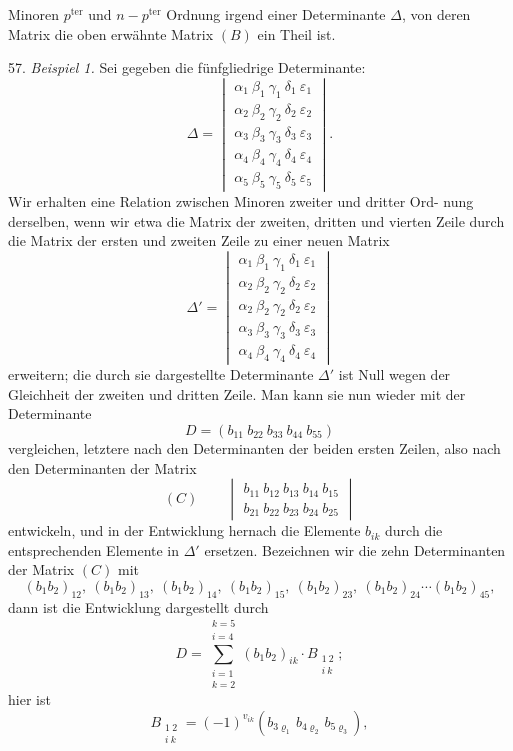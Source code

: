 Minoren $p^{\text{ter}}$ und $n-p^{\text{ter}}$ Ordnung irgend einer Determinante $\Delta$, von
deren Matrix die oben erwähnte Matrix $(B)$ ein Theil ist.

57. \textit{Beispiel 1.} Sei gegeben die fünfgliedrige Determinante:
\[
\Delta = \begin{vmatrix}
\alpha_1\ \beta_1\ \gamma_1\ \delta_1\ \varepsilon_1 \\
\alpha_2\ \beta_2\ \gamma_2\ \delta_2\ \varepsilon_2 \\
\alpha_3\ \beta_3\ \gamma_3\ \delta_3\ \varepsilon_3 \\
\alpha_4\ \beta_4\ \gamma_4\ \delta_4\ \varepsilon_4 \\
\alpha_5\ \beta_5\ \gamma_5\ \delta_5\ \varepsilon_5
\end{vmatrix} .
\]
Wir erhalten eine Relation zwischen Minoren zweiter und dritter Ord-
nung derselben, wenn wir etwa die Matrix der zweiten, dritten und
vierten Zeile durch die Matrix der ersten und zweiten Zeile zu einer
neuen Matrix
\[
\Delta' = \begin{vmatrix}
\alpha_1\ \beta_1\ \gamma_1\ \delta_1\ \varepsilon_1 \\
\alpha_2\ \beta_2\ \gamma_2\ \delta_2\ \varepsilon_2 \\
\alpha_2\ \beta_2\ \gamma_2\ \delta_2\ \varepsilon_2 \\
\alpha_3\ \beta_3\ \gamma_3\ \delta_3\ \varepsilon_3 \\
\alpha_4\ \beta_4\ \gamma_4\ \delta_4\ \varepsilon_4
\end{vmatrix}
\]
erweitern; die durch sie dargestellte Determinante $\Delta'$ ist Null wegen
der Gleichheit der zweiten und dritten Zeile. Man kann sie nun wieder
mit der Determinante
\[
D = \left(b_{11}\ b_{22}\ b_{33}\ b_{44}\ b_{55}\right)
\]
vergleichen, letztere nach den Determinanten der beiden ersten Zeilen,
also nach den Determinanten der Matrix
\[
(C) \qquad \begin{vmatrix} b_{11}\ b_{12}\ b_{13}\ b_{14}\ b_{15} \\ b_{21}\ b_{22}\ b_{23}\ b_{24}\ b_{25} \end{vmatrix}
\]
entwickeln, und in der Entwicklung hernach die Elemente $b_{ik}$ durch
die entsprechenden Elemente in $\Delta'$ ersetzen. Bezeichnen wir die zehn
Determinanten der Matrix $(C)$ mit
\[
(b_1b_2)_{12},\ (b_1b_2)_{13},\ (b_1b_2)_{14},\ (b_1b_2)_{15},\ (b_1b_2)_{23},\ (b_1b_2)_{24}\cdots (b_1b_2)_{45},
\]
dann ist die Entwicklung dargestellt durch
\[
D = \sum_{\substack{i=1\\ k=2}}^{\substack{k=5\\ i=4}} (b_1b_2)_{ik}\cdot B_{\substack{1\ 2\\ i\ k}};
\]
hier ist
\[
B_{\substack{1\ 2\\ i\ k}} = (-1)^{v_{ik}}\left(b_{3\varrho_1}\, b_{4\varrho_2}\, b_{5\varrho_3}\right),
\]


